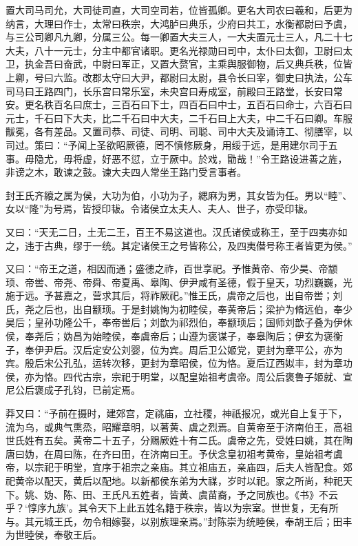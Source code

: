 \documentclass[]{article}
\begin{document}
置大司马司允，大司徒司直，大司空司若，位皆孤卿。更名大司农曰羲和，后更为纳言，大理曰作士，太常曰秩宗，大鸿胪曰典乐，少府曰共工，水衡都尉曰予虞，与三公司卿凡九卿，分属三公。每一卿置大夫三人，一大夫置元士三人，凡二十七大夫，八十一元士，分主中都官诸职。更名光禄勋曰司中，太仆曰太御，卫尉曰太卫，执金吾曰奋武，中尉曰军正，又置大赘官，主乘舆服御物，后又典兵秩，位皆上卿，号曰六监。改郡太守曰大尹，都尉曰太尉，县令长曰宰，御史曰执法，公车司马曰王路四门，长乐宫曰常乐室，未央宫曰寿成室，前殿曰王路堂，长安曰常安。更名秩百名曰庶士，三百石曰下士，四百石曰中士，五百石曰命士，六百石曰元士，千石曰下大夫，比二千石曰中大夫，二千石曰上大夫，中二千石曰卿。车服黻冕，各有差品。又置司恭、司徒、司明、司聪、司中大夫及诵诗工、彻膳宰，以司过。策曰：``予闻上圣欲昭厥德，罔不慎修厥身，用绥于远，是用建尔司于五事。毋隐尤，毋将虚，好恶不愆，立于厥中。於戏，勖哉！''令王路设进善之旌，非谤之木，敢谏之鼓。谏大夫四人常坐王路门受言事者。

封王氏齐縗之属为侯，大功为伯，小功为子，緦麻为男，其女皆为任。男以``睦''、女以``隆''为号焉，皆授印韨。令诸侯立太夫人、夫人、世子，亦受印韨。

又曰：``天无二日，土无二王，百王不易这道也。汉氏诸侯或称王，至于四夷亦如之，违于古典，缪于一统。其定诸侯王之号皆称公，及四夷僣号称王者皆更为侯。''

又曰：``帝王之道，相因而通；盛德之祚，百世享祀。予惟黄帝、帝少昊、帝颛顼、帝喾、帝尧、帝舜、帝夏禹、皋陶、伊尹咸有圣德，假于皇天，功烈巍巍，光施于远。予甚嘉之，营求其后，将祚厥祀。''惟王氏，虞帝之后也，出自帝喾；刘氏，尧之后也，出自颛顼。于是封姚恂为初睦侯，奉黄帝后；梁护为脩远伯，奉少昊后；皇孙功隆公千，奉帝喾后；刘歆为祁烈伯，奉颛顼后；国师刘歆子叠为伊休侯，奉尧后；妫昌为始睦侯，奉虞帝后；山遵为褒谋子，奉皋陶后；伊玄为褒衡子，奉伊尹后。汉后定安公刘婴，位为宾。周后卫公姬党，更封为章平公，亦为宾。殷后宋公孔弘，运转次移，更封为章昭侯，位为恪。夏后辽西姒丰，封为章功侯，亦为恪。四代古宗，宗祀于明堂，以配皇始祖考虞帝。周公后褒鲁子姬就、宣尼公后褒成子孔钧，已前定焉。

莽又曰：``予前在摄时，建郊宫，定祧庙，立社稷，神祇报况，或光自上复于下，流为乌，或典气熏烝，昭耀章明，以著黄、虞之烈焉。自黄帝至于济南伯王，高祖世氏姓有五矣。黄帝二十五子，分赐厥姓十有二氏。虞帝之先，受姓曰姚，其在陶唐曰妫，在周曰陈，在齐曰田，在济南曰王。予伏念皇初祖考黄帝，皇始祖考虞帝，以宗祀于明堂，宜序于祖宗之亲庙。其立祖庙五，亲庙四，后夫人皆配食。郊祀黄帝以配天，黄后以配地。以新都侯东弟为大禖，岁时以祀。家之所尚，种祀天下。姚、妫、陈、田、王氏凡五姓者，皆黄、虞苗裔，予之同族也。《书》不云乎？`惇序九族'。其令天下上此五姓名籍于秩宗，皆以为宗室。世世复，无有所与。其元城王氏，勿令相嫁娶，以别族理亲焉。''封陈崇为统睦侯，奉胡王后；田丰为世睦侯，奉敬王后。
\end{document}
